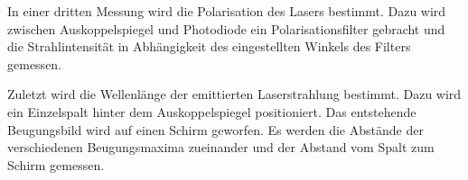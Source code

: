 In einer dritten Messung wird die Polarisation des Lasers bestimmt. Dazu wird
zwischen Auskoppelspiegel und Photodiode ein Polarisationsfilter gebracht und
die Strahlintensität in Abhängigkeit des eingestellten Winkels des Filters
gemessen.

Zuletzt wird die Wellenlänge der emittierten Laserstrahlung bestimmt. Dazu wird
ein Einzelspalt hinter dem Auskoppelspiegel positioniert. Das entstehende
Beugungsbild wird auf einen Schirm geworfen. Es werden die Abstände der
verschiedenen Beugungsmaxima zueinander und der Abstand vom Spalt zum Schirm
gemessen.
